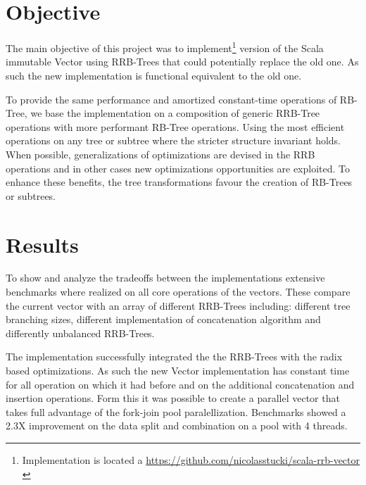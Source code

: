 \section{Objective}
The main objective of this project was to implement\footnote{Implementation is located a \url{https://github.com/nicolasstucki/scala-rrb-vector} \cite{projecRepo}} version of the Scala immutable Vector using RRB-Trees that could potentially replace the old one. As such the new implementation is functional equivalent to the old one.

To provide the same performance and amortized constant-time operations of RB-Tree, we base the implementation on a composition of generic RRB-Tree operations with more performant RB-Tree operations. Using the most efficient operations on any tree or subtree where the stricter structure invariant holds. When possible, generalizations of optimizations are devised in the RRB operations and in other cases new optimizations opportunities are exploited. To enhance these benefits, the tree transformations favour the creation of RB-Trees or subtrees.


\section{Results}
To show and analyze the tradeoffs between the implementations extensive benchmarks where realized on all core operations of the vectors. These compare the current vector with an array of different RRB-Trees including: different tree branching sizes, different implementation of concatenation algorithm and differently unbalanced RRB-Trees.  

The implementation successfully integrated the the RRB-Trees with the radix based optimizations. As such the new Vector implementation has constant time for all operation on which it had before and on the additional concatenation and insertion operations. Form this it was possible to create a parallel vector that takes full advantage of the fork-join pool paralellization. Benchmarks showed a 2.3X improvement on the data split and combination on a pool with 4 threads.


